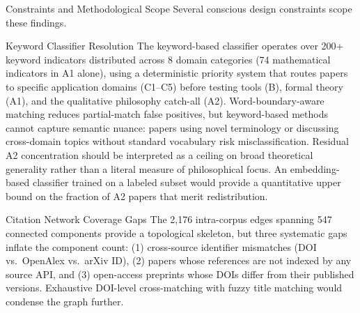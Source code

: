 \documentclass[
  ignorenonframetext,
]{beamer}
\begin{document}
\begin{frame}[allowframebreaks]{Constraints and Methodological Scope}
\protect{}\label{constraints-and-methodological-scope}
Several conscious design constraints scope these findings.

\begin{block}{Keyword Classifier Resolution}
\protect{}\label{keyword-classifier-resolution}
The keyword-based classifier operates over 200+ keyword indicators
distributed across 8 domain categories (74 mathematical indicators in A1
alone), using a deterministic priority system that routes papers to
specific application domains (C1--C5) before testing tools (B), formal
theory (A1), and the qualitative philosophy catch-all (A2).
Word-boundary-aware matching reduces partial-match false positives, but
keyword-based methods cannot capture semantic nuance: papers using novel
terminology or discussing cross-domain topics without standard
vocabulary risk misclassification. Residual A2 concentration should be
interpreted as a ceiling on broad theoretical generality rather than a
literal measure of philosophical focus. An embedding-based classifier
trained on a labeled subset would provide a quantitative upper bound on
the fraction of A2 papers that merit redistribution.
\end{block}

\begin{block}{Citation Network Coverage Gaps}
\protect{}\label{citation-network-coverage-gaps}
The 2,176 intra-corpus edges spanning 547 connected components provide a
topological skeleton, but three systematic gaps inflate the component
count: (1) cross-source identifier mismatches (DOI vs.~OpenAlex
vs.~arXiv ID), (2) papers whose references are not indexed by any source
API, and (3) open-access preprints whose DOIs differ from their
published versions. Exhaustive DOI-level cross-matching with fuzzy title
matching would condense the graph further.
\end{block}


\end{frame}
\end{document}

